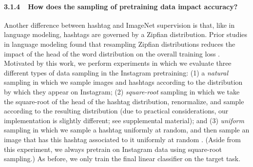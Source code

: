 \documentclass[runningheads]{llncs}
\begin{document}
\begin{figure}[t!]
\begin{floatrow}



\end{floatrow}
\end{figure}

\paragraph{3.1.4~~How does the sampling of pretraining data impact accuracy?} Another difference between hashtag and ImageNet supervision is that, like in language modeling, hashtags are governed by a Zipfian distribution. Prior studies in language modeling found that resampling Zipfian distributions reduces the impact of the head of the word distribution on the overall training loss \cite{mikolov2013word2vec}. Motivated by this work, we perform experiments in which we evaluate three different types of data sampling in the Instagram pretraining: (1) a \emph{natural} sampling in which we sample images and hashtags according to the distribution by which they appear on Instagram; (2) \emph{square-root} sampling \cite{mikolov2013word2vec} in which we take the square-root of the head of the hashtag distribution, renormalize, and sample according to the resulting distribution (due to practical considerations, our implementation is slightly different; see supplemental material); and (3) \emph{uniform} sampling in which we sample a hashtag uniformly at random, and then sample an image that has this hashtag associated to it uniformly at random \cite{joulin2016learning}. (Aside from this experiment, we always pretrain on Instagram data using square-root sampling.) As before, we only train the final linear classifier on the target task.
\end{document}
